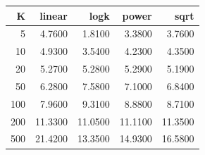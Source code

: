 \begin{tabular}{rrrrr}
\toprule
K & linear & logk & power & sqrt \\
\midrule
5 & 4.7600 & 1.8100 & 3.3800 & 3.7600 \\
10 & 4.9300 & 3.5400 & 4.2300 & 4.3500 \\
20 & 5.2700 & 5.2800 & 5.2900 & 5.1900 \\
50 & 6.2800 & 7.5800 & 7.1000 & 6.8400 \\
100 & 7.9600 & 9.3100 & 8.8800 & 8.7100 \\
200 & 11.3300 & 11.0500 & 11.1100 & 11.3500 \\
500 & 21.4200 & 13.3500 & 14.9300 & 16.5800 \\
\bottomrule
\end{tabular}
